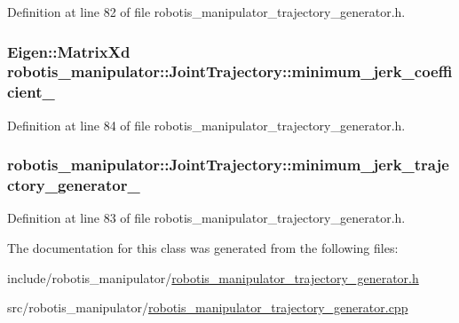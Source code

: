Definition at line 82 of file robotis\+\_\+manipulator\+\_\+trajectory\+\_\+generator.\+h.

\subsubsection[{\texorpdfstring{minimum\+\_\+jerk\+\_\+coefficient\+\_\+}{minimum_jerk_coefficient_}}]{\setlength{\rightskip}{0pt plus 5cm}Eigen\+::\+Matrix\+Xd robotis\+\_\+manipulator\+::\+Joint\+Trajectory\+::minimum\+\_\+jerk\+\_\+coefficient\+\_\+\hspace{0.3cm}{\ttfamily [private]}}\hypertarget{classrobotis__manipulator_1_1_joint_trajectory_a74b431132c75c6840b70ea62f65d3c48}{}\label{classrobotis__manipulator_1_1_joint_trajectory_a74b431132c75c6840b70ea62f65d3c48}


Definition at line 84 of file robotis\+\_\+manipulator\+\_\+trajectory\+\_\+generator.\+h.

\subsubsection[{\texorpdfstring{minimum\+\_\+jerk\+\_\+trajectory\+\_\+generator\+\_\+}{minimum_jerk_trajectory_generator_}}]{ robotis\+\_\+manipulator\+::\+Joint\+Trajectory\+::minimum\+\_\+jerk\+\_\+trajectory\+\_\+generator\+\_\+\hspace{0.3cm}{\ttfamily [private]}}\hypertarget{classrobotis__manipulator_1_1_joint_trajectory_a7138717ca5cd53ca07e3ff9c68494170}{}\label{classrobotis__manipulator_1_1_joint_trajectory_a7138717ca5cd53ca07e3ff9c68494170}


Definition at line 83 of file robotis\+\_\+manipulator\+\_\+trajectory\+\_\+generator.\+h.



The documentation for this class was generated from the following files\+:\begin{DoxyCompactItemize}
\item 
include/robotis\+\_\+manipulator/\hyperlink{robotis__manipulator__trajectory__generator_8h}{robotis\+\_\+manipulator\+\_\+trajectory\+\_\+generator.\+h}\item 
src/robotis\+\_\+manipulator/\hyperlink{robotis__manipulator__trajectory__generator_8cpp}{robotis\+\_\+manipulator\+\_\+trajectory\+\_\+generator.\+cpp}\end{DoxyCompactItemize}
